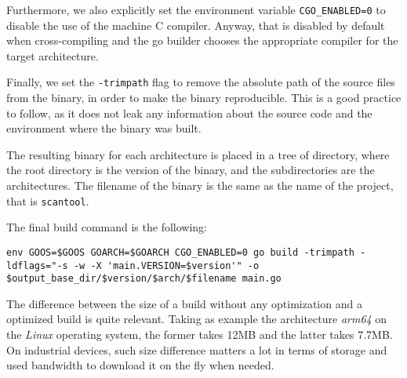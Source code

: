 Furthermore, we also explicitly set the environment variable \texttt{CGO\_ENABLED=0} to disable the use of the machine C compiler. Anyway, that is disabled by default when cross-compiling and the go builder chooses the appropriate compiler for the target architecture.~\cite{go-cgo-compiler}

Finally, we set the \texttt{-trimpath} flag to remove the absolute path of the source files from the binary, in order to make the binary reproducible. This is a good practice to follow, as it does not leak any information about the source code and the environment where the binary was built.~\cite{go-trimpath-arg}

The resulting binary for each architecture is placed in a tree of directory, where the root directory is the version of the binary, and the subdirectories are the architectures. The filename of the binary is the same as the name of the project, that is \texttt{scantool}.

The final build command is the following:
\begin{lstlisting}[caption={Go tool cross-build command}]
  env GOOS=$GOOS GOARCH=$GOARCH CGO_ENABLED=0 go build -trimpath -ldflags="-s -w -X 'main.VERSION=$version'" -o $output_base_dir/$version/$arch/$filename main.go
\end{lstlisting}

The difference between the size of a build without any optimization and a optimized build is quite relevant. Taking as example the architecture \textit{arm64} on the \textit{Linux} operating system, the former takes 12MB and the latter takes 7.7MB. On industrial devices, such size difference matters a lot in terms of storage and used bandwidth to download it on the fly when needed.


